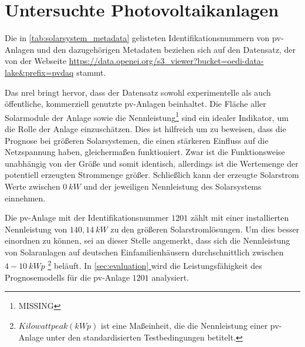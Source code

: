 \documentclass[12pt, a4paper]{article}
\newcommand*{\fullref}[1]{\hyperref[{#1}]{\autoref*{#1} \nameref*{#1}}}
\begin{document}
\newpage

\section{Untersuchte Photovoltaikanlagen}

Die in \autoref{tab:solarsystem_metadata} gelisteten Identifikationsnummern von \ac{pv}-Anlagen und den dazugehörigen Metadaten beziehen sich auf den Datensatz, der von der Webseite \url{https://data.openei.org/s3_viewer?bucket=oedi-data-lake&prefix=pvdaq} stammt.

Das \ac{nrel} bringt hervor, dass der Datensatz sowohl experimentelle als auch öffentliche, kommerziell genutzte \ac{pv}-Anlagen beinhaltet. Die Fläche aller Solarmodule der Anlage sowie die Nennleistung\footnote{MISSING} sind ein idealer Indikator, um die Rolle der Anlage einzuschätzen. Dies ist hilfreich um zu beweisen, dass die Prognose bei größeren Solarsystemen, die einen stärkeren Einfluss auf die Netzspannung haben, gleichermaßen funktioniert. Zwar ist die Funktionsweise unabhängig von der Größe und somit identisch, allerdings ist die Wertemenge der potentiell erzeugten Strommenge größer. Schließlich kann der erzeugte Solarstrom Werte zwischen $0 \ kW$ und der jeweiligen Nennleistung des Solarsystems einnehmen. 

Die \ac{pv}-Anlage mit der Identifikationsnummer $1201$ zählt mit einer installierten Nennleistung von $140,14 \ kW$ zu den größeren Solarstromlösungen. Um dies besser einordnen zu können, sei an dieser Stelle angemerkt, dass sich die Nennleistung von Solaranlagen auf deutschen Einfamilienhäusern durchschnittlich zwischen $4 - 10 \ kWp$ \footnote{$Kilowattpeak (kWp)$ ist eine Maßeinheit, die die Nennleistung einer \ac{pv}-Anlage unter den standardisierten Testbedingungen betitelt.} beläuft. In \fullref{sec:evaluation} wird die Leistungsfähigkeit des Prognosemodells für die \ac{pv}-Anlage $1201$ analysiert.
\end{document}
